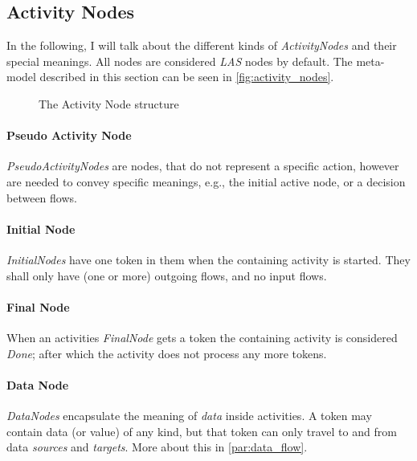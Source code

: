 \subsection{Activity Nodes}\label{ssec:activity_nodes}

In the following, I will talk about the different kinds of \emph{ActivityNodes} and their special meanings. All nodes are considered \emph{LAS} nodes by default. The meta-model described in this section can be seen in \autoref{fig:activity_nodes}.

\begin{figure}[!ht]
	\centering
	
	\caption{The Activity Node structure}
	\label{fig:activity_nodes}
\end{figure}

\paragraph{Pseudo Activity Node}

\emph{PseudoActivityNodes} are nodes, that do not represent a specific action, however are needed to convey specific meanings, e.g., the initial active node, or a decision between flows.

\paragraph{Initial Node}

\emph{InitialNodes} have one token in them when the containing activity is started. They shall only have (one or more) outgoing flows, and no input flows. 

\paragraph{Final Node}

When an activities \emph{FinalNode} gets a token the containing activity is considered \emph{Done}; after which the activity does not process any more tokens.

\paragraph{Data Node}

\emph{DataNodes} encapsulate the meaning of \emph{data} inside activities. A token may contain data (or value) of any kind, but that token can only travel to and from data \emph{sources} and \emph{targets}. More about this in \autoref{par:data_flow}.

